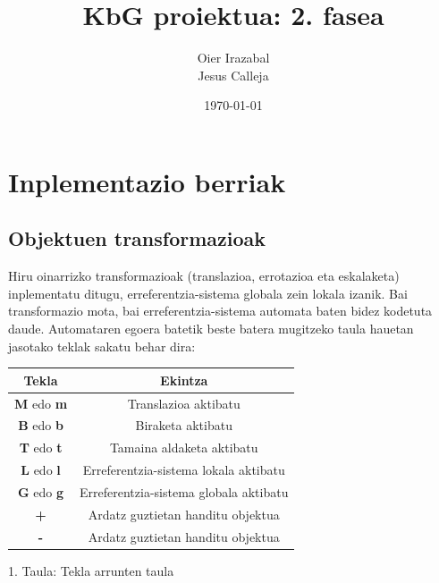 \documentclass[12pt]{article}
\title{KbG proiektua: 2. fasea}
\author{
        Oier Irazabal\\
        Jesus Calleja
}
\date{\today}
\begin{document}
\maketitle


\tableofcontents

\pagebreak



\section{Inplementazio berriak}\label{intro}

\subsection{Objektuen transformazioak}

Hiru oinarrizko transformazioak (translazioa, errotazioa eta eskalaketa) inplementatu ditugu, erreferentzia-sistema globala zein lokala izanik.
Bai transformazio mota, bai erreferentzia-sistema automata baten bidez kodetuta daude. Automataren egoera batetik beste batera mugitzeko taula hauetan jasotako teklak sakatu behar dira:\\

\begin{center}

\begin{tabular}{|c|c|}
																				\hline
	Tekla							& Ekintza									\\	\hline
	\textbf{M} edo \textbf{m}		& Translazioa aktibatu						\\	\hline
	\textbf{B} edo \textbf{b}		& Biraketa aktibatu							\\	\hline
	\textbf{T} edo \textbf{t}		& Tamaina aldaketa aktibatu					\\	\hline
	\textbf{L} edo \textbf{l}		& Erreferentzia-sistema lokala aktibatu	\\	\hline
	\textbf{G} edo \textbf{g}		& Erreferentzia-sistema globala aktibatu	\\	\hline
	\textbf{+}						& Ardatz guztietan handitu objektua		\\	\hline
	\textbf{-}						& Ardatz guztietan handitu objektua		\\	\hline
\end{tabular}

\vspace{0.3cm}
1. Taula: Tekla arrunten taula
\end{center}
\end{document}
